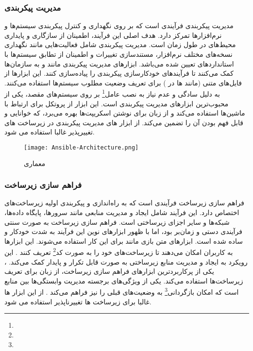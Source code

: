\subsubsection{مدیریت پیکربندی}
مدیریت پیکربندی فرآیندی است که بر روی نگهداری و کنترل پیکربندی سیستم‌ها و نرم‌افزارها تمرکز دارد. هدف اصلی این فرآیند، اطمینان از سازگاری و پایداری محیط‌های  در طول زمان است. مدیریت پیکربندی شامل فعالیت‌هایی مانند نگهداری نسخه‌های مختلف نرم‌افزار، مستندسازی تغییرات و اطمینان از تطابق سیستم‌ها با استانداردهای تعیین شده می‌باشد. ابزارهای مدیریت پیکربندی مانند  و  به سازمان‌ها کمک می‌کنند تا فرآیندهای خودکارسازی پیکربندی را پیاده‌سازی کنند. این ابزارها از فایل‌های متنی (مانند ها در ) برای تعریف وضعیت مطلوب سیستم‌ها استفاده می‌کنند.  \cite{Ansible} به دلیل سادگی و عدم نیاز به نصب عامل\footnote{} بر روی سیستم‌های مقصد، یکی از محبوب‌ترین ابزارهای مدیریت پیکربندی است. این ابزار از پروتکل  برای ارتباط با ماشین‌ها استفاده می‌کند و از زبان  برای نوشتن اسکریپت‌ها بهره می‌برد، که خوانایی و قابل فهم بودن آن را تضمین می‌کند. از ابزار های مدیریت پیکربندی در زیرساخت های تغییرپذیر غالبا استفاده می شود.

\begin{figure}[!t]
	\centering
	\texttt{[image: Ansible-Architecture.png]}
	\caption{معماری }
	\label{fig: ansible arch}
\end{figure}

\subsubsection{فراهم سازی زیرساخت}
فراهم سازی زیرساخت فرآیندی است که به راه‌اندازی و پیکربندی اولیه زیرساخت‌های  اختصاص دارد. این فرآیند شامل ایجاد و مدیریت منابعی مانند سرورها، پایگاه داده‌ها، شبکه‌ها و سایر اجزای زیرساختی است. فراهم سازی زیرساخت به صورت سنتی فرآیندی دستی و زمان‌بر بود، اما با ظهور ابزارهای نوین این فرآیند به شدت خودکار و ساده شده است. ابزارهای متن بازی مانند  برای این کار استفاده می‌شوند. این ابزارها به کاربران امکان می‌دهند تا زیرساخت‌های خود را به صورت کد\footnote{} تعریف کنند \cite{DevopsIaac1}. این رویکرد به ایجاد و مدیریت منابع زیرساختی به صورت قابل تکرار و پایدار کمک می‌کند. ، یکی از پرکاربردترین ابزارهای فراهم سازی زیرساخت، از زبان  برای تعریف زیرساخت‌ها استفاده می‌کند. یکی از ویژگی‌های برجسته  مدیریت وابستگی‌ها بین منابع است که امکان بازگردانی\footnote{} به وضعیت‌های قبلی را نیز فراهم می‌کند \cite{Terraform}. از این ابزار ها غالبا برای زیرساخت ها تغییرناپذیر استفاده می شود.

